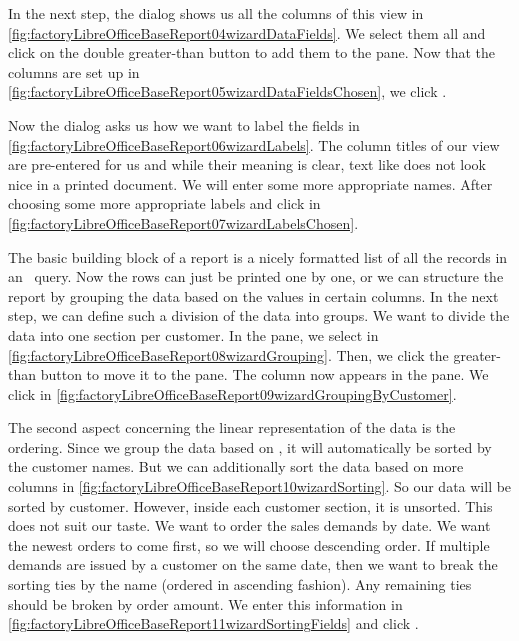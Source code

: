 In the next step, the dialog shows us all the columns of this view in \cref{fig:factoryLibreOfficeBaseReport04wizardDataFields}.
We select them all and click on the double greater-than button \menu{\textgreater\textgreater} to add them to the  pane.
Now that the columns are set up in \cref{fig:factoryLibreOfficeBaseReport05wizardDataFieldsChosen}, we click .

Now the dialog asks us how we want to label the fields in \cref{fig:factoryLibreOfficeBaseReport06wizardLabels}.
The column titles of our view are pre-entered for us and while their meaning is clear, text like  does not look nice in a printed document.
We will enter some more appropriate names.
After choosing some more appropriate labels and click  in \cref{fig:factoryLibreOfficeBaseReport07wizardLabelsChosen}.

The basic building block of a report is a nicely formatted list of all the records in an \sql\ query.
Now the rows can just be printed one by one, or we can structure the report by grouping the data based on the values in certain columns.
In the next step, we can define such a division of the data into groups.
We want to divide the data into one section per customer.
In the  pane, we select  in \cref{fig:factoryLibreOfficeBaseReport08wizardGrouping}.
Then, we click the greater-than button \menu{\textgreater} to move it to the  pane.
The column now appears in the  pane.
We click  in \cref{fig:factoryLibreOfficeBaseReport09wizardGroupingByCustomer}.

The second aspect concerning the linear representation of the data is the ordering.
Since we group the data based on , it will automatically be sorted by the customer names.
But we can additionally sort the data based on more columns in \cref{fig:factoryLibreOfficeBaseReport10wizardSorting}.
So our data will be sorted by customer.
However, inside each customer section, it is unsorted.
This does not suit our taste.
We want to order the sales demands by  date.
We want the newest orders to come first, so we will choose descending order.
If multiple demands are issued by a customer on the same date, then we want to break the sorting ties by the  name (ordered in ascending fashion).
Any remaining ties should be broken by order amount.
We enter this information in \cref{fig:factoryLibreOfficeBaseReport11wizardSortingFields} and click .


